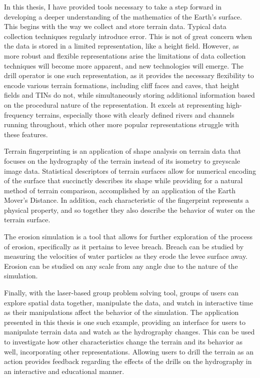 
In this thesis, I have provided tools necessary to take a step forward in developing a deeper understanding of the mathematics of the Earth's surface. This begins with the way we collect and store terrain data. Typical data collection techniques regularly introduce error. This is not of great concern when the data is stored in a limited representation, like a height field. However, as more robust and flexible representations arise the limitations of data collection techniques will become more apparent, and new technologies will emerge. The drill operator is one such representation, as it provides the necessary flexibility to encode various terrain formations, including cliff faces and caves, that height fields and TINs do not, while simultaneously storing additional information based on the procedural nature of the representation. It excels at representing high-frequency terrains, especially those with clearly defined rivers and channels running throughout, which other more popular representations struggle with these features.


Terrain fingerprinting is an application of shape analysis on terrain data that focuses on the hydrography of the terrain instead of its isometry to greyscale image data. Statistical descriptors of terrain surfaces allow for numerical encoding of the surface that succinctly describes its shape while providing for a natural method of terrain comparison, accomplished by an application of the Earth Mover's Distance. In addition, each characteristic of the fingerprint represents a physical property, and so together they also describe the behavior of water on the terrain surface.

The erosion simulation is a tool that allows for further exploration of the process of erosion, specifically as it pertains to levee breach. Breach can be studied by measuring the velocities of water particles as they erode the levee surface away. Erosion can be studied on any scale from any angle due to the nature of the simulation.

Finally, with the laser-based group problem solving tool, groups of users can explore spatial data together, manipulate the data, and watch in interactive time as their manipulations affect the behavior of the simulation. The application presented in this thesis is one such example, providing an interface for users to manipulate terrain data and watch as the hydrography changes. This can be used to investigate how other characteristics change the terrain and its behavior as well, incorporating other representations. Allowing users to drill the terrain as an action provides feedback regarding the effects of the drills on the hydrography in an interactive and educational manner.






